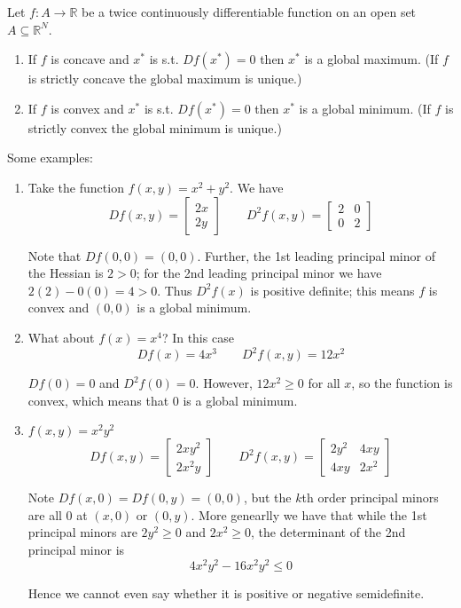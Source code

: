 \documentclass{article}
\begin{document}
\begin{theorem}
  Let $f: A \to \mathbb{R}$ be a twice continuously differentiable function on an open set $A \subseteq \mathbb{R}^N$.
  \begin{enumerate}
    \item If $f$ is concave and $x^*$ is s.t. $Df(x^*) = 0$ then $x^*$ is a global maximum. (If $f$ is strictly concave the global maximum is unique.)

    \item If $f$ is convex and $x^*$ is s.t. $Df(x^*) = 0$ then $x^*$ is a global minimum. (If $f$ is strictly convex the global minimum is unique.)
  \end{enumerate}
\end{theorem}

Some examples:
\begin{enumerate}
  \item Take the function $f(x, y) = x^2 + y^2$. We have
    \[
      Df(x, y) = \left[\begin{matrix}
      2x \\ 2y
      \end{matrix}\right]
      \quad\quad
      D^2f(x, y) = \left[\begin{matrix}
        2 & 0 \\ 0 & 2
      \end{matrix}\right]
    \]

    Note that $Df(0, 0) = (0, 0)$. Further, the 1st leading principal minor of the Hessian is $2 > 0$; for the 2nd leading principal minor we have $2(2) - 0(0) = 4 > 0$. Thus $D^2f(x)$ is positive definite; this means $f$ is convex and $(0, 0)$ is a global minimum.

  \item What about $f(x) = x^4$? In this case
    \[
      Df(x) = 4x^3
      \quad\quad
      D^2f(x, y) = 12x^2
    \]

    $Df(0) = 0$ and $D^2f(0) = 0$. However, $12x^2 \ge 0$ for all $x$, so the function is convex, which means that $0$ is a global minimum.

  \item $f(x, y) = x^2y^2$
    \[
      Df(x, y) = \left[\begin{matrix}
      2xy^2 \\ 2x^2y
      \end{matrix}\right]
      \quad\quad
      D^2f(x, y) = \left[\begin{matrix}
        2y^2 & 4xy \\ 4xy & 2x^2
      \end{matrix}\right]
    \]

    Note $Df(x, 0) = Df(0, y) = (0, 0)$, but the $k$th order principal minors are all $0$ at $(x, 0)$ or $(0, y)$. More genearlly we have that while the 1st principal minors are $2y^2 \ge 0$ and $2x^2 \ge 0$, the determinant of the 2nd principal minor is
    \[
        4x^2y^2 - 16x^2y^2 \le 0
    \]

    Hence we cannot even say whether it is positive or negative semidefinite.
\end{enumerate}


\clearpage
\printindex

\end{document}

